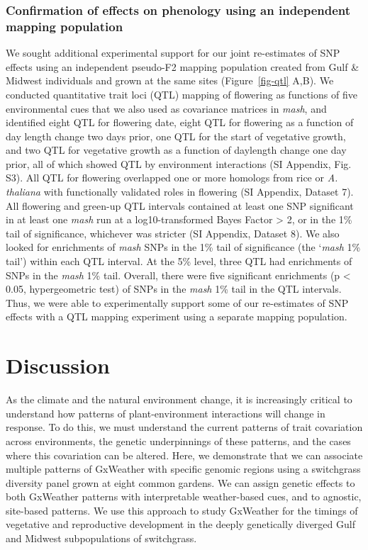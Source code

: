 \documentclass[
  9pt,
  twocolumn,
  twoside]{pnas-new}
\begin{document}
\subsubsection{Confirmation of effects on phenology using an independent
mapping
population}\label{confirmation-of-effects-on-phenology-using-an-independent-mapping-population}

We sought additional experimental support for our joint re-estimates of
SNP effects using an independent pseudo-F2 mapping population created
from Gulf \& Midwest individuals and grown at the same sites
(Figure~\ref{fig-qtl} A,B). We conducted quantitative trait loci (QTL)
mapping of flowering as functions of five environmental cues that we
also used as covariance matrices in \emph{mash}, and identified eight
QTL for flowering date, eight QTL for flowering as a function of day
length change two days prior, one QTL for the start of vegetative
growth, and two QTL for vegetative growth as a function of daylength
change one day prior, all of which showed QTL by environment
interactions (SI Appendix, Fig. S3). All QTL for flowering overlapped
one or more homologs from rice or \emph{A. thaliana} with functionally
validated roles in flowering (SI Appendix, Dataset 7). All flowering and
green-up QTL intervals contained at least one SNP significant in at
least one \emph{mash} run at a log10-transformed Bayes Factor
\textgreater{} 2, or in the 1\% tail of significance, whichever was
stricter (SI Appendix, Dataset 8). We also looked for enrichments of
\emph{mash} SNPs in the 1\% tail of significance (the `\emph{mash} 1\%
tail') within each QTL interval. At the 5\% level, three QTL had
enrichments of SNPs in the \emph{mash} 1\% tail. Overall, there were
five significant enrichments (p \textless{} 0.05, hypergeometric test)
of SNPs in the \emph{mash} 1\% tail in the QTL intervals. Thus, we were
able to experimentally support some of our re-estimates of SNP effects
with a QTL mapping experiment using a separate mapping population.

\section{Discussion}\label{discussion}

As the climate and the natural environment change, it is increasingly
critical to understand how patterns of plant-environment interactions
will change in response. To do this, we must understand the current
patterns of trait covariation across environments, the genetic
underpinnings of these patterns, and the cases where this covariation
can be altered. Here, we demonstrate that we can associate multiple
patterns of GxWeather with specific genomic regions using a switchgrass
diversity panel grown at eight common gardens. We can assign genetic
effects to both GxWeather patterns with interpretable weather-based
cues, and to agnostic, site-based patterns. We use this approach to
study GxWeather for the timings of vegetative and reproductive
development in the deeply genetically diverged Gulf and Midwest
subpopulations of switchgrass.
\end{document}

